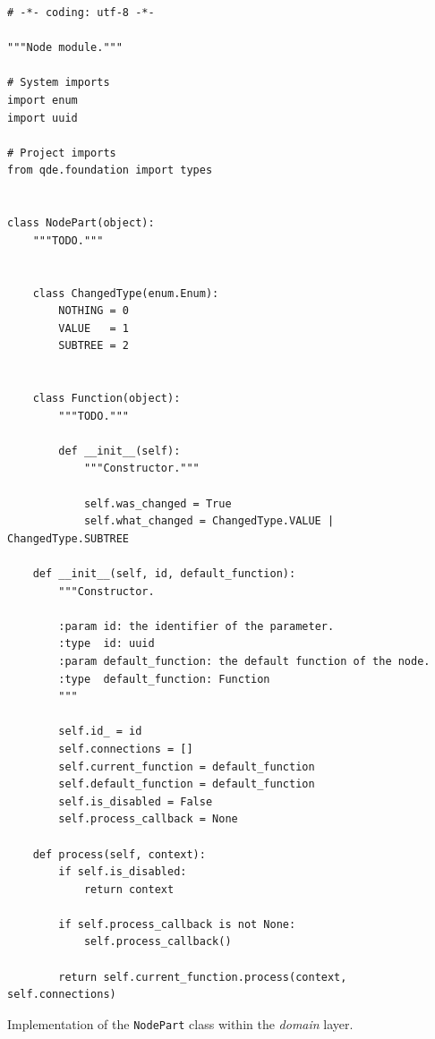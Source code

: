 \documentclass[10pt, openright, notitlepage]{scrreprt}
\begin{document}
\begin{listing}[H]
\begin{verbatim}
# -*- coding: utf-8 -*-

"""Node module."""

# System imports
import enum
import uuid

# Project imports
from qde.foundation import types


class NodePart(object):
    """TODO."""


    class ChangedType(enum.Enum):
        NOTHING = 0
        VALUE   = 1
        SUBTREE = 2


    class Function(object):
        """TODO."""

        def __init__(self):
            """Constructor."""

            self.was_changed = True
            self.what_changed = ChangedType.VALUE | ChangedType.SUBTREE

    def __init__(self, id, default_function):
        """Constructor.

        :param id: the identifier of the parameter.
        :type  id: uuid
        :param default_function: the default function of the node.
        :type  default_function: Function
        """

        self.id_ = id
        self.connections = []
        self.current_function = default_function
        self.default_function = default_function
        self.is_disabled = False
        self.process_callback = None

    def process(self, context):
        if self.is_disabled:
            return context

        if self.process_callback is not None:
            self.process_callback()

        return self.current_function.process(context, self.connections)
\end{verbatim}
\caption{\label{lst:domain-parameter-parameterpart}
Implementation of the \texttt{NodePart} class within the \emph{domain} layer.}
\end{listing}
\end{document}
